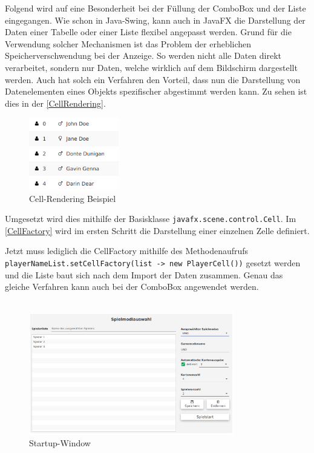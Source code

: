 Folgend wird auf eine Besonderheit bei der Füllung der ComboBox und der Liste eingegangen.
Wie schon in Java-Swing, kann auch in JavaFX die Darstellung der Daten einer Tabelle oder einer Liste flexibel angepasst werden.
Grund für die Verwendung solcher Mechanismen ist das Problem der erheblichen Speicherverschwendung bei der Anzeige.
So werden nicht alle Daten direkt verarbeitet, sondern nur Daten, welche wirklich auf dem Bildschirm dargestellt werden.
Auch hat solch ein Verfahren den Vorteil, dass nun die Darstellung von Datenelementen eines Objekts spezifischer abgestimmt werden kann.
Zu sehen ist dies in der \autoref{CellRendering}.
\begin{figure}[H]
\centering
\includegraphics[width=0.35\textwidth]{fig/ainf/CellRendering}
\caption{Cell-Rendering Beispiel}
\label{CellRendering}
\end{figure}
Umgesetzt wird dies mithilfe der Basisklasse \lstinline[style=java]{javafx.scene.control.Cell}.
Im \autoref{CellFactory} wird im ersten Schritt die Darstellung einer einzelnen Zelle definiert.

Jetzt muss lediglich die CellFactory mithilfe des Methodenaufrufs \lstinline[style=java]{playerNameList.setCellFactory(list -> new PlayerCell())} gesetzt werden und die Liste baut sich nach dem Import der Daten zusammen.
Genau das gleiche Verfahren kann auch bei der ComboBox angewendet werden.\\\\
\begin{figure}[H]
\centering
\includegraphics[width=0.8\textwidth]{fig/ainf/Startup_German.png}
\caption{Startup-Window}
\label{startupWindow}
\end{figure}
